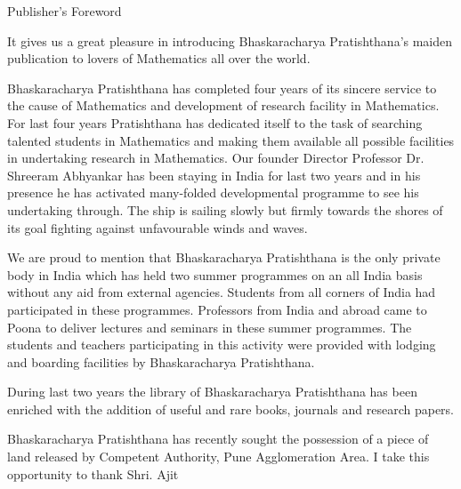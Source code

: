 \documentclass[]{article}
\date{}
\begin{document}
{Publisher's Foreword}{\\
}

{It gives us a great pleasure in introducing Bhaskaracharya
Pratishthana's maiden publication to lovers of Mathematics all over the
world.}

{Bhaskaracharya Pratishthana has completed four years of its sincere
service to the cause of Mathematics and development of research facility
in Mathematics. For last four years Pratishthana has dedicated itself to
the task of searching talented students in Mathematics and making them
available all possible facilities in undertaking research in
Mathematics. Our founder Director Professor Dr. Shreeram Abhyankar has
been staying in India for last two years and in his presence he has
activated many-folded developmental programme to see his undertaking
through. The ship is sailing slowly but firmly towards the shores of its
goal fighting against unfavourable winds and waves.}

{We are proud to mention that Bhaskaracharya Pratishthana is the only
private body in India which has held two summer programmes on an all
India basis without any aid from external agencies. Students from all
corners of India had participated in these programmes. Professors from
India and abroad came to Poona to deliver lectures and seminars in these
summer programmes. The students and teachers participating in this
activity were provided with lodging and boarding facilities by
Bhaskaracharya Pratishthana.}

{During last two years the library of Bhaskaracharya Pratishthana has
been enriched with the addition of useful and rare books, journals and
research papers.}

{Bhaskaracharya Pratishthana has recently sought the possession of a
piece of land released by Competent Authority, Pune Agglomeration Area.
I take this opportunity to thank Shri. Ajit}
\end{document}
